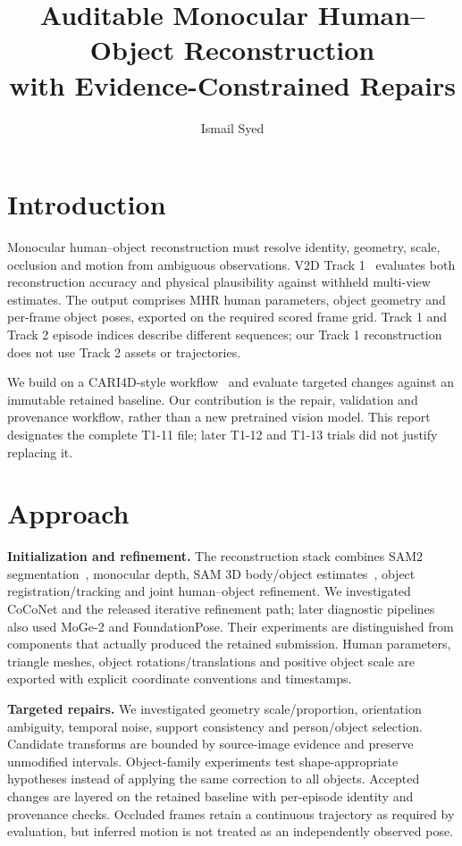 \documentclass[10pt]{nvidiaextabstract}
\title{Auditable Monocular Human--Object Reconstruction\\with Evidence-Constrained Repairs}
\author[1,2]{Ismail Syed}
\affil[1]{University of Texas at Austin}
\affil[2]{\href{https://www.longhorizon.bot}{www.longhorizon.bot}}
\affil[ ]{\texttt{syedim@gmail.com}}
\begin{document}
\maketitle
\section{Introduction}
Monocular human--object reconstruction must resolve identity, geometry, scale,
occlusion and motion from ambiguous observations. V2D Track 1~\cite{v2d}
evaluates both reconstruction accuracy and physical plausibility against
withheld multi-view estimates. The output comprises MHR human parameters,
object geometry and per-frame object poses, exported on the required scored
frame grid. Track 1 and Track 2 episode indices describe different sequences;
our Track 1 reconstruction does not use Track 2 assets or trajectories.

We build on a CARI4D-style workflow~\cite{cari4d} and evaluate targeted
changes against an immutable retained baseline. Our contribution is the
repair, validation and provenance workflow, rather than a new pretrained
vision model. This report designates the complete T1-11 file; later T1-12 and
T1-13 trials did not justify replacing it.

\section{Approach}
\textbf{Initialization and refinement.}
The reconstruction stack combines SAM2 segmentation~\cite{sam2}, monocular
depth, SAM 3D body/object estimates~\cite{sam3d}, object registration/tracking
and joint human--object refinement. We investigated CoCoNet and the released
iterative refinement path; later diagnostic pipelines also used MoGe-2 and
FoundationPose. Their experiments are distinguished from components that
actually produced the retained submission. Human parameters, triangle meshes,
object rotations/translations and positive object scale are exported with
explicit coordinate conventions and timestamps.

\textbf{Targeted repairs.}
We investigated geometry scale/proportion, orientation ambiguity, temporal
noise, support consistency and person/object selection. Candidate transforms
are bounded by source-image evidence and preserve unmodified intervals.
Object-family experiments test shape-appropriate hypotheses instead of
applying the same correction to all objects. Accepted changes are layered on
the retained baseline with per-episode identity and provenance checks.
Occluded frames retain a continuous trajectory as required by evaluation,
but inferred motion is not treated as an independently observed pose.
\end{document}
